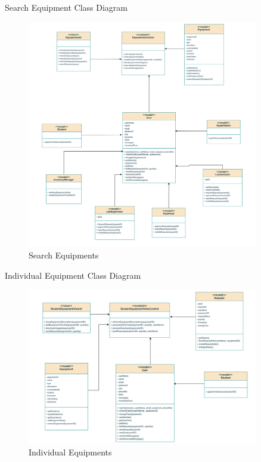 \documentclass[20pt]{beamer}
\numberwithin{figure}{section}
\begin{document}
\begin{frame}{Search Equipment Class Diagram}

     \begin{figure}
        \centering
        \includegraphics[width= 0.9\textwidth , height= 0.8\paperheight]{EquipmentSearchUML.png}
        \caption{{Search Equipments}}
        \label{fig:7}
    \end{figure}

\end{frame}

\begin{frame}{Individual Equipment Class Diagram}

     \begin{figure}
        \centering
        \includegraphics[width= 0.9\textwidth , height= 0.8\paperheight]{IndividualEquipmentUML.png}
        \caption{{Individual Equipments}}
        \label{fig:8}
    \end{figure}

\end{frame}
\end{document}
